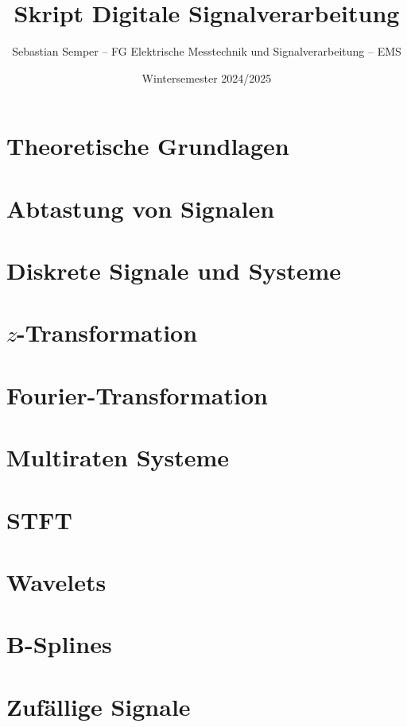 \documentclass[ngerman]{article}
\title{Skript Digitale Signalverarbeitung}
\date{Wintersemester 2024/2025}
\author{Sebastian Semper -- FG Elektrische Messtechnik und Signalverarbeitung -- EMS}
\begin{document}

%
%
\section{Theoretische Grundlagen}\label{basics}
%

%
%
\section{Abtastung von Signalen}\label{sampling}
%

%
%
\section{Diskrete Signale und Systeme}\label{disc_sys}
%

%
%
\section{\texorpdfstring{$z$}{z}-Transformation}\label{ztrafo}
%

%
%
\section{Fourier-Transformation}\label{fourier}
%

%
%
\section{Multiraten Systeme}\label{multirate}
%

%
%
\section{STFT}\label{stft}
%

%
%
\section{Wavelets}\label{wavelets}
%

%
%
\section{B-Splines}\label{bsplines}
%

%
%
\section{Zuf\"allige Signale}\label{random}
%

%
%
%
%
%

\end{document}
